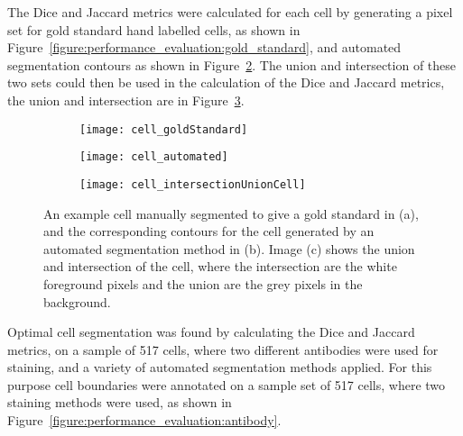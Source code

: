 The Dice and Jaccard metrics were calculated for each cell by generating a pixel set for gold standard hand labelled cells, as shown in Figure~\ref{figure:performance_evaluation:gold_standard}, and automated segmentation contours as shown in Figure~\ref{figure:performance_evaluation:cell_automated}. The union and intersection of these two sets could then be used in the calculation of the Dice and Jaccard metrics, the union and intersection are in Figure~\ref{figure:performance_evaluation:cell_intersectionUnionCell}.

\begin{figure}[htbp]\centering
	\begin{subfigure}[b]{0.32\linewidth}
		\centering
		\texttt{[image: cell\_goldStandard]}
		\caption{}
		\label{figure:performance_evaluation:cell_gold_standard}
		\vspace{1ex}
	\end{subfigure}
	\begin{subfigure}[b]{0.32\linewidth}
		\centering
		\texttt{[image: cell\_automated]}
		\caption{}
		\label{figure:performance_evaluation:cell_automated}
		\vspace{1ex}
	\end{subfigure}
	\begin{subfigure}[b]{0.32\linewidth}
		\centering
		\texttt{[image: cell\_intersectionUnionCell]}
		\caption{}
		\label{figure:performance_evaluation:cell_intersectionUnionCell}
		\vspace{1ex}
	\end{subfigure}
\caption[Example cell pixel sets gold standard, automated segmentation, and union and intersection]{An example cell manually segmented to give a gold standard in (a), and the corresponding contours for the cell generated by an automated segmentation method in (b). Image (c) shows the union and intersection of the cell, where the intersection are the white foreground pixels and the union are the grey pixels in the background.}
\label{figure:performance_evaluation:cell}
\end{figure}

Optimal cell segmentation was found by calculating the Dice and Jaccard metrics, on a sample of 517 cells, where two different antibodies were used for staining, and a variety of automated segmentation methods applied. For this purpose cell boundaries were annotated on a sample set of 517 cells, where two staining methods were used, as shown in Figure~\ref{figure:performance_evaluation:antibody}.

